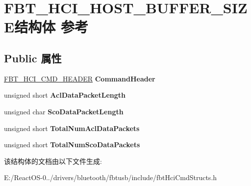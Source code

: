 \hypertarget{struct_f_b_t___h_c_i___h_o_s_t___b_u_f_f_e_r___s_i_z_e}{}\section{F\+B\+T\+\_\+\+H\+C\+I\+\_\+\+H\+O\+S\+T\+\_\+\+B\+U\+F\+F\+E\+R\+\_\+\+S\+I\+Z\+E结构体 参考}
\label{struct_f_b_t___h_c_i___h_o_s_t___b_u_f_f_e_r___s_i_z_e}
\subsection*{Public 属性}
\begin{DoxyCompactItemize}
\item 
\mbox{\label{struct_f_b_t___h_c_i___h_o_s_t___b_u_f_f_e_r___s_i_z_e_a0ab715fddd8764af13208bf52ee2c2d7}} 
\hyperlink{struct_f_b_t___h_c_i___c_m_d___h_e_a_d_e_r}{F\+B\+T\+\_\+\+H\+C\+I\+\_\+\+C\+M\+D\+\_\+\+H\+E\+A\+D\+ER} {\bfseries Command\+Header}
\item 
\mbox{\label{struct_f_b_t___h_c_i___h_o_s_t___b_u_f_f_e_r___s_i_z_e_a7a8b0831b2672f811c9e25e7d73d57aa}} 
unsigned short {\bfseries Acl\+Data\+Packet\+Length}
\item 
\mbox{\label{struct_f_b_t___h_c_i___h_o_s_t___b_u_f_f_e_r___s_i_z_e_a03da07bb72d1860a1b8c76357b30244f}} 
unsigned char {\bfseries Sco\+Data\+Packet\+Length}
\item 
\mbox{\label{struct_f_b_t___h_c_i___h_o_s_t___b_u_f_f_e_r___s_i_z_e_aeefa796538b3a74ce9add1ab9ccdb92f}} 
unsigned short {\bfseries Total\+Num\+Acl\+Data\+Packets}
\item 
\mbox{\label{struct_f_b_t___h_c_i___h_o_s_t___b_u_f_f_e_r___s_i_z_e_a97f357ceda0ff4c153fed0421fbfc1f5}} 
unsigned short {\bfseries Total\+Num\+Sco\+Data\+Packets}
\end{DoxyCompactItemize}


该结构体的文档由以下文件生成\+:\begin{DoxyCompactItemize}
\item 
E\+:/\+React\+O\+S-\/0../drivers/bluetooth/fbtusb/include/fbt\+Hci\+Cmd\+Structs.\+h\end{DoxyCompactItemize}
